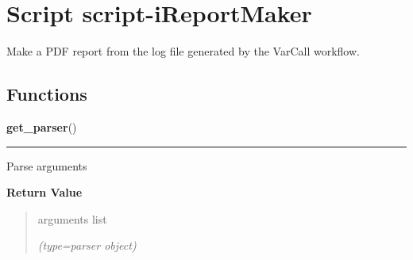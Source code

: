 %
%
%


\section{Script script-iReportMaker}

    \label{script-iReportMaker}
Make a PDF report from the log file generated by the VarCall workflow.



  \subsection{Functions}

    \label{script-iReportMaker:get_parser}

    \vspace{0.5ex}

\hspace{.8\funcindent}\begin{boxedminipage}{\funcwidth}

    \raggedright \textbf{get\_parser}()

    \vspace{-1.5ex}

    \rule{\textwidth}{0.5\fboxrule}
\setlength{\parskip}{2ex}
    Parse arguments

\setlength{\parskip}{1ex}
      \textbf{Return Value}
    \vspace{-1ex}

      \begin{quote}
      arguments list

      {\it (type=parser object)}

      \end{quote}

    \end{boxedminipage}


